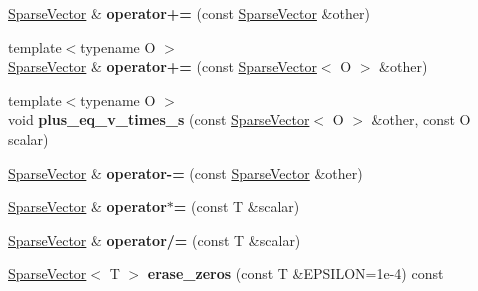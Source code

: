 \begin{DoxyCompactItemize}
\item 
\mbox{\label{classcpyp_1_1_sparse_vector_a060ea06d6b5426e06947931b0a05ae6c}} 
\mbox{\hyperlink{classcpyp_1_1_sparse_vector}{Sparse\+Vector}} \& {\bfseries operator+=} (const \mbox{\hyperlink{classcpyp_1_1_sparse_vector}{Sparse\+Vector}} \&other)
\item 
\mbox{\label{classcpyp_1_1_sparse_vector_a56b0f9bcfacc501b49fd4fdb0f50c44c}} 
{\footnotesize template$<$typename O $>$ }\\\mbox{\hyperlink{classcpyp_1_1_sparse_vector}{Sparse\+Vector}} \& {\bfseries operator+=} (const \mbox{\hyperlink{classcpyp_1_1_sparse_vector}{Sparse\+Vector}}$<$ O $>$ \&other)
\item 
\mbox{\label{classcpyp_1_1_sparse_vector_a49594df40000b3985af19df84007f15f}} 
{\footnotesize template$<$typename O $>$ }\\void {\bfseries plus\+\_\+eq\+\_\+v\+\_\+times\+\_\+s} (const \mbox{\hyperlink{classcpyp_1_1_sparse_vector}{Sparse\+Vector}}$<$ O $>$ \&other, const O scalar)
\item 
\mbox{\label{classcpyp_1_1_sparse_vector_a68b75ee85385070d85657219b358ca7b}} 
\mbox{\hyperlink{classcpyp_1_1_sparse_vector}{Sparse\+Vector}} \& {\bfseries operator-\/=} (const \mbox{\hyperlink{classcpyp_1_1_sparse_vector}{Sparse\+Vector}} \&other)
\item 
\mbox{\label{classcpyp_1_1_sparse_vector_a402c045bd9b8126a35f865a76870e1c6}} 
\mbox{\hyperlink{classcpyp_1_1_sparse_vector}{Sparse\+Vector}} \& {\bfseries operator$\ast$=} (const T \&scalar)
\item 
\mbox{\label{classcpyp_1_1_sparse_vector_a3bec2d66757d348ea72bbd16d3afe90a}} 
\mbox{\hyperlink{classcpyp_1_1_sparse_vector}{Sparse\+Vector}} \& {\bfseries operator/=} (const T \&scalar)
\item 
\mbox{\label{classcpyp_1_1_sparse_vector_acc496c92f53002a95fec694ee9d5fcc6}} 
\mbox{\hyperlink{classcpyp_1_1_sparse_vector}{Sparse\+Vector}}$<$ T $>$ {\bfseries erase\+\_\+zeros} (const T \&E\+P\+S\+I\+L\+ON=1e-\/4) const

\end{DoxyCompactItemize}
